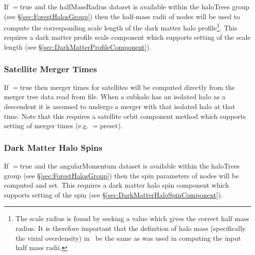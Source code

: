 If {\normalfont \ttfamily [mergerTreeReadPresetScaleRadii]}$=${\normalfont \ttfamily true} and the {\normalfont \ttfamily halfMassRadius} dataset is available within the {\normalfont \ttfamily haloTrees} group (see \S\ref{sec:ForestHalosGroup}) then the half-mass radii of nodes will be used to compute the corresponding scale length of the dark matter halo profile\footnote{The scale radius is found by seeking a value which gives the correct half mass radius. It is therefore important that the definition of halo mass (specifically the virial overdensity) in \protect\glc\ be the same as was used in computing the input half mass radii.}. This requires a dark matter profile scale component which supports setting of the scale length (see \S\ref{sec:DarkMatterProfileComponent}).

\subsubsection{Satellite Merger Times}

If {\normalfont \ttfamily [mergerTreeReadPresetMergerTimes]}$=${\normalfont \ttfamily true} then merger times for satellites will be computed directly from the merger tree data read from file. When a subhalo has an isolated halo as a descendent it is assumed to undergo a merger with that isolated halo at that time. Note that this requires a satellite orbit component method which supports setting of merger times (e.g. {\normalfont \ttfamily [treeNodeMethodSatelliteOrbit]}$=${\normalfont \ttfamily preset}).

\subsubsection{Dark Matter Halo Spins}

If {\normalfont \ttfamily [mergerTreeReadPresetSpins]}$=${\normalfont \ttfamily true} and the {\normalfont \ttfamily angularMomentum} dataset is available within the {\normalfont \ttfamily haloTrees} group (see \S\ref{sec:ForestHalosGroup}) then the spin parameters of nodes will be computed and set. This requires a dark matter halo spin component which supports setting of the spin (see \S\ref{sec:DarkMatterHaloSpinComponent}).
